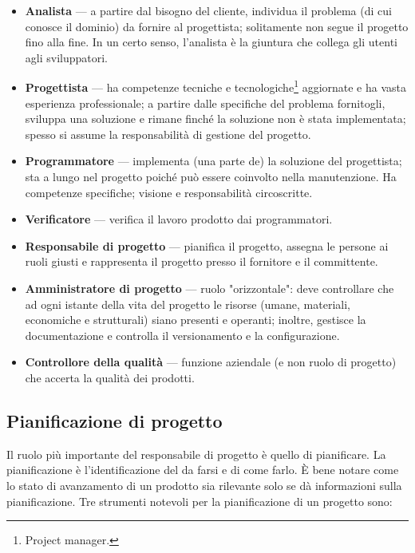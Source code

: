 \documentclass[a4paper]{article}
\begin{document}
	\begin{itemize}
		
			
	\item \textbf{Analista} — a partire dal bisogno del cliente, individua il problema (di cui conosce il dominio) da fornire al progettista; solitamente non segue il progetto fino alla fine. In un certo senso, l'analista è la giuntura che collega gli utenti agli sviluppatori.
			
	\item \textbf{Progettista} — ha competenze tecniche e tecnologiche\footnote{Project manager.} aggiornate e ha vasta esperienza professionale; a partire dalle specifiche del problema fornitogli, sviluppa una soluzione e rimane finché la soluzione non è stata implementata; spesso si assume la responsabilità di gestione del progetto.
			
	\item \textbf{Programmatore} — implementa (una parte de) la soluzione del progettista; sta a lungo nel progetto poiché può essere coinvolto nella manutenzione. Ha competenze specifiche; visione e responsabilità circoscritte.
			
	\item \textbf{Verificatore} — verifica il lavoro prodotto dai programmatori.
			
	\item \textbf{Responsabile di progetto} — pianifica il progetto, assegna le persone ai ruoli giusti e rappresenta il progetto presso il fornitore e il committente.
			
	\item \textbf{Amministratore di progetto} — ruolo "orizzontale": deve controllare che ad ogni istante della vita del progetto le risorse (umane, materiali, economiche e strutturali) siano presenti e operanti; inoltre, gestisce la documentazione e controlla il versionamento e la configurazione.
			
	\item \textbf{Controllore della qualità} — funzione aziendale (e non ruolo di progetto) che accerta la qualità dei prodotti.
		
	\end{itemize}


		
	\subsection{Pianificazione di progetto}

		
Il ruolo più importante del responsabile di progetto è quello di pianificare. La pianificazione è l'identificazione del da farsi e di come farlo. È bene notare come lo stato di avanzamento di un prodotto sia rilevante solo se dà informazioni sulla pianificazione. Tre strumenti notevoli per la pianificazione di un progetto sono:
		
\end{document}
